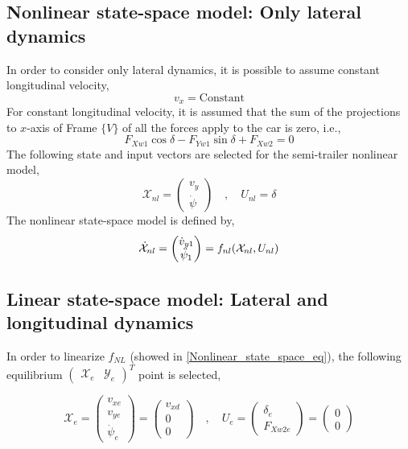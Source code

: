 \documentclass[12pt]{article}
\begin{document}
\subsection{Nonlinear state-space model: Only lateral dynamics }
In order to consider only lateral dynamics, it is possible to assume constant longitudinal velocity,
\begin{equation}
    v_x = \mathrm{Constant}
\end{equation}
For constant longitudinal velocity, it is assumed that the sum of the projections to $x$-axis of Frame $\{ V \}$ of all the forces apply to the car is zero, i.e.,
\begin{equation}
    F_{Xw1} \cos{\delta} - F_{Yw1} \sin{\delta} + F_{Xw2} = 0
\end{equation}
The following state and input vectors are selected for the semi-trailer nonlinear model,
\begin{equation}\label{NL_states_input_vx}
    \mathcal{X}_{nl} = \begin{pmatrix} v_{y} \\ \Dot{\psi} \end{pmatrix} \quad , \quad U_{nl} = \delta 
\end{equation}
The nonlinear state-space model is defined by,
\begin{equation} \label{Nonlinear_state_space_vx_eq}
    \Dot{\mathcal{X}}_{nl} = \begin{pmatrix} \Dot{v}_{y1} \\ \Ddot{\psi}_1 \end{pmatrix} = f_{nl}(\mathcal{X}_{nl},U_{nl})
\end{equation}

\subsection{Linear state-space model: Lateral and longitudinal dynamics}

In order to linearize $f_{NL}$ (showed in \eqref{Nonlinear_state_space_eq}), the following equilibrium $ \begin{pmatrix} \mathcal{X}_e & \mathcal{Y}_e\end{pmatrix}^T$ point is selected,

\begin{equation}
    \mathcal{X}_e = \begin{pmatrix} v_{xe} \\ v_{ye} \\ \Dot{\psi}_{e} \end{pmatrix} = \begin{pmatrix} v_{xd} \\ 0 \\ 0  \end{pmatrix} \quad , \quad U_e = \begin{pmatrix} \delta_{e} \\ F_{Xw2e} \end{pmatrix} = \begin{pmatrix} 0 \\ 0 \end{pmatrix}
\end{equation}
\end{document}

